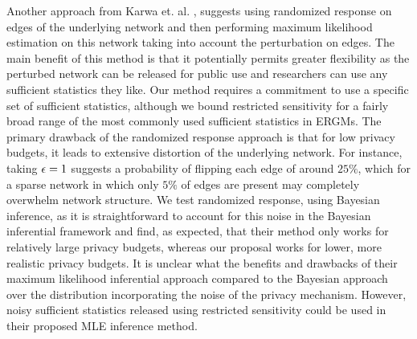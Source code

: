 Another approach from Karwa et. al. \cite{KKS17}, suggests using randomized response on edges of the underlying network and then performing maximum likelihood estimation on this network taking into account the perturbation on edges. The main benefit of this method is that it potentially permits greater flexibility as the perturbed network can be released for public use and researchers can use any sufficient statistics they like. Our method requires a commitment to use a specific set of sufficient statistics, although we bound restricted sensitivity for a fairly broad range of the most commonly used sufficient statistics in ERGMs. The primary drawback of the randomized response approach is that for low privacy budgets, it leads to extensive distortion of the underlying network. For instance, taking $\epsilon =1$ suggests a probability of flipping each edge of around $25\%$, which for a sparse network in which only $5\%$ of edges are present may completely overwhelm network structure. We test randomized response, using Bayesian inference, as it is straightforward to account for this noise in the Bayesian inferential framework and find, as expected, that their method only works for relatively large privacy budgets, whereas our proposal works for lower, more realistic privacy budgets. It is unclear what the benefits and drawbacks of their maximum likelihood inferential approach compared to the Bayesian approach over the distribution incorporating the noise of the privacy mechanism. However, noisy sufficient statistics released using restricted sensitivity could be used in their proposed MLE inference method.



